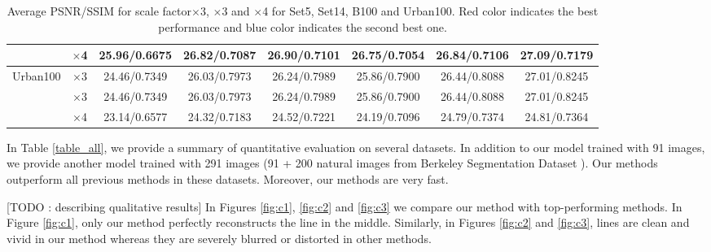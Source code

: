 \documentclass[10pt,twocolumn,letterpaper]{article}
\begin{document}
\begin{table}
\begin{center}
\begin{tabular}{ | c | c | c | c | c | c | c | c | }
 & $\times$4 & 25.96/0.6675 & 26.82/0.7087 & {\color{blue}26.90}/0.7101 & 26.75/0.7054 & 26.84/{\color{blue}0.7106} & {\color{red}27.09}/{\color{red}0.7179}\\
\hline
\hline
\multirow{3}{*}{Urban100} & $\times$3 & 24.46/0.7349 & 26.03/0.7973 & 26.24/0.7989 & 25.86/0.7900 & {\color{blue}26.44}/{\color{blue}0.8088} & {\color{red}27.01}/{\color{red}0.8245}\\
 & $\times$3 & 24.46/0.7349 & 26.03/0.7973 & 26.24/0.7989 & 25.86/0.7900 & {\color{blue}26.44}/{\color{blue}0.8088} & {\color{red}27.01}/{\color{red}0.8245}\\
 & $\times$4 & 23.14/0.6577 & 24.32/0.7183 & 24.52/0.7221 & 24.19/0.7096 & {\color{blue}24.79}/{\color{red}0.7374} & {\color{red}24.81}/{\color{blue}0.7364}\\
\hline
\end{tabular}
\caption{Average PSNR/SSIM for scale factor$\times$3, $\times$3 and $\times$4 for Set5, Set14, B100 and Urban100. {\color{red}Red color} indicates the best performance and {\color{blue}blue color} indicates the second best one.}
\end{center}
\end{table}

In Table \ref{table_all}, we provide a summary of quantitative evaluation on several datasets. In addition to our model trained with 91 images, we provide another model trained with 291 images (91 + 200 natural images from Berkeley Segmentation Dataset \cite{Martin2001}).
Our methods outperform all previous methods in these datasets. Moreover, our methods are very fast.

[TODO : describing qualitative results]
In Figures \ref{fig:c1}, \ref{fig:c2} and \ref{fig:c3} we compare our method with top-performing methods. In Figure \ref{fig:c1}, only our method perfectly reconstructs the line in the middle. Similarly, in Figures \ref{fig:c2} and \ref{fig:c3}, lines are clean and vivid in our method whereas they are severely blurred or distorted in other methods.
\end{document}
